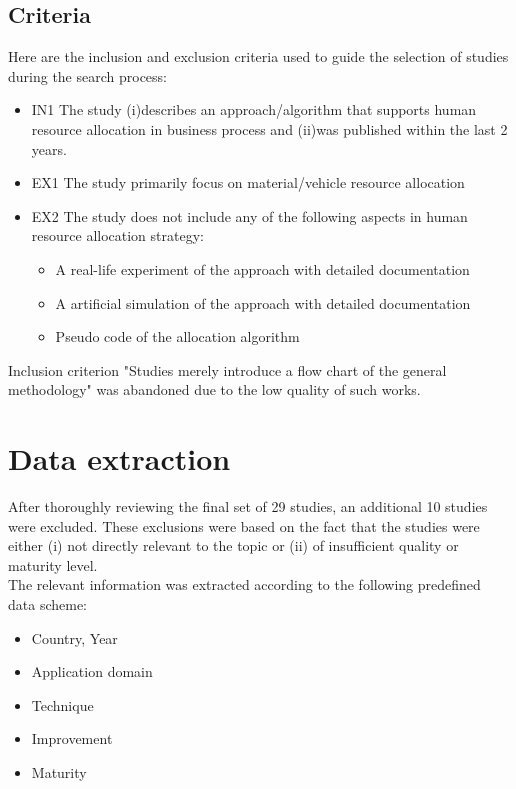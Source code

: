 \documentclass[runningheads]{llncs}
\begin{document}
\subsection{Criteria}
Here are the inclusion and exclusion criteria used to guide the selection of studies during the search process:
\begin{itemize}
    \item IN1 The study (i)describes an approach/algorithm that supports human resource allocation in business process and (ii)was published within the last 2 years.

    \item EX1 The study primarily focus on material/vehicle resource allocation
    \item EX2 The study does not include any of the following aspects in human resource allocation strategy: 
    \begin{itemize}
        \item A real-life experiment of the approach with detailed documentation
        \item A artificial simulation of the approach with detailed documentation
        \item Pseudo code of the allocation algorithm
    \end{itemize}
\end{itemize}
Inclusion criterion "Studies merely introduce a flow chart of the general methodology" was abandoned due to the low quality of such works.

\section{Data extraction}
After thoroughly reviewing the final set of 29 studies, an additional 10 studies were excluded. These exclusions were based on the fact that the studies were either (i) not directly relevant to the topic or (ii) of insufficient quality or maturity level.  \\The relevant information was extracted according to the following predefined data scheme:
\begin{itemize}
    \item Country, Year
    \item Application domain
    \item Technique
    \item Improvement
    \item Maturity
\end{itemize}

\begin{figure}[H]
\end{figure}
\end{document}

